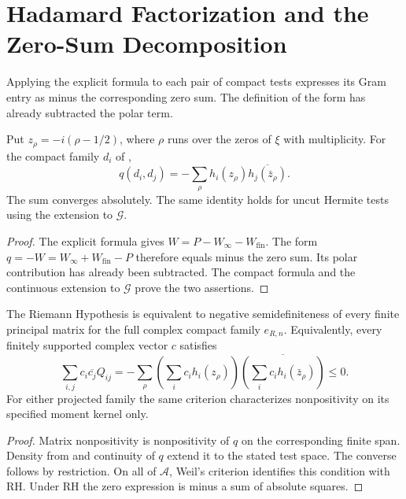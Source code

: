 \section{Hadamard Factorization and the Zero-Sum Decomposition}
\label{v4-arith:w7-h:hadamard}

Applying the explicit formula to each pair of compact tests expresses
its Gram entry as minus the corresponding zero sum. The definition
of the form has already subtracted the polar term.

\begin{theorem}
\label{v4-arith:w7-h:thm:hadamard}
Put $z_\rho=-i(\rho-1/2)$, where $\rho$ runs over the zeros of
$\xi$ with multiplicity. For the compact family $d_i$ of
,
\begin{equation}
\label{v4-arith:w7-h:eq:hadamard}
 q(d_i,d_j)=-\sum_\rho h_i(z_\rho)
                           \overline{h_j(\bar z_\rho)}.
\end{equation}
The sum converges absolutely. The same identity holds for uncut
Hermite tests using the extension to $\mathscr G$.
\end{theorem}
\begin{proof}
The explicit formula gives $W=P-W_\infty-W_{\mathrm{fin}}$.
The form $q=-W=W_\infty+W_{\mathrm{fin}}-P$ therefore equals
minus the zero sum. Its polar contribution has already been subtracted.
The compact formula and the continuous extension to $\mathscr G$
prove the two assertions.
\end{proof}

\begin{corollary}
\label{v4-arith:w7-h:cor:RH-equivalence}
The Riemann Hypothesis is equivalent to negative semidefiniteness
of every finite principal matrix for the full complex compact family
$e_{R,n}$. Equivalently, every finitely supported complex vector $c$
satisfies
\begin{equation}
\label{v4-arith:w7-h:eq:Q-NSD}
 \sum_{i,j}c_i\overline{c_j}Q_{ij}
 =-\sum_\rho\left(\sum_i c_i h_i(z_\rho)\right)
       \overline{\left(\sum_i c_i h_i(\bar z_\rho)\right)}\le0.
\end{equation}
For either projected family the same criterion characterizes
nonpositivity on its specified moment kernel only.
\end{corollary}
\begin{proof}
Matrix nonpositivity is nonpositivity of $q$ on the corresponding
finite span. Density from 
and continuity of $q$ extend it to the stated test space.
The converse follows by restriction. On all of $\mathscr A$,
Weil's criterion identifies this condition with RH.
Under RH the zero expression is minus a sum of absolute squares.
\end{proof}

